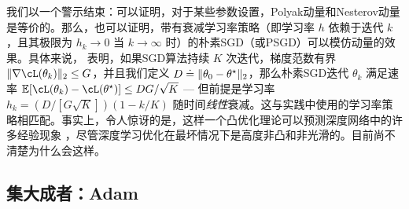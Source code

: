 \documentclass[../../book-main.tex]{subfiles}
\begin{document}
我们以一个警示结束：可以证明，对于某些参数设置，Polyak动量和Nesterov动量是等价的。那么，也可以证明，带有衰减学习率策略（即学习率 \(h\) 依赖于迭代 \(k\)，且其极限为 \(h_{k} \to 0\) 当 \(k \to \infty\) 时）的朴素SGD（或PSGD）可以模仿动量的效果。具体来说，\cite{defazio2023optimal} 表明，如果SGD算法持续 \(K\) 次迭代，梯度范数有界 \(\norm{\nabla \cL(\theta_{k})}_{2} \leq G\)，并且我们定义 \(D \doteq \norm{\theta_{0} - \theta^{\star}}_{2}\)，那么朴素SGD迭代 \(\theta_{k}\) 满足速率 \(\Ex[\cL(\theta_{k}) - \cL(\theta^{\star})] \leq DG/\sqrt{K}\) --- 但前提是学习率 \(h_{k} = (D/[G\sqrt{K}])(1 - k/K)\) 随时间\textit{线性}衰减。这与实践中使用的学习率策略相匹配。事实上，令人惊讶的是，这样一个凸优化理论可以预测深度网络中的许多经验现象 \cite{schaipp2025surprising}，尽管深度学习优化在最坏情况下是高度非凸和非光滑的。目前尚不清楚为什么会这样。


\subsection{集大成者：Adam}
\end{document}
